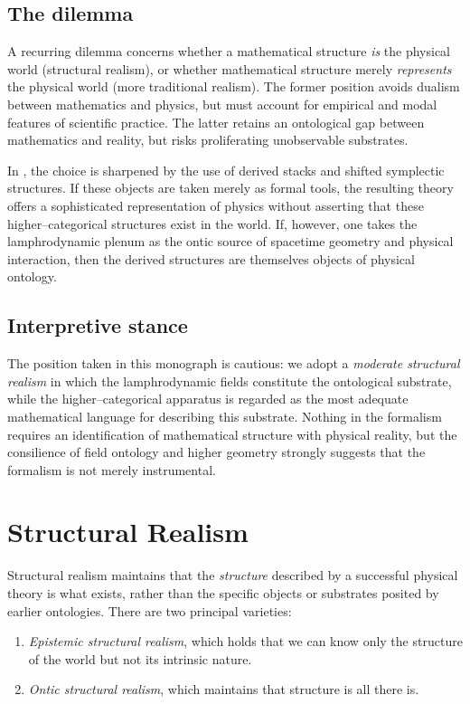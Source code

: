 \subsection{The dilemma}
A recurring dilemma concerns whether a mathematical structure \emph{is}
the physical world (structural realism), or whether mathematical
structure merely \emph{represents} the physical world (more traditional
realism).  The former position avoids dualism between mathematics and
physics, but must account for empirical and modal features of
scientific practice.  The latter retains an ontological gap between
mathematics and reality, but risks proliferating unobservable
substrates.

In \rsvpabbr{}, the choice is sharpened by the use of derived stacks and
shifted symplectic structures.  If these objects are taken merely as
formal tools, the resulting theory offers a sophisticated representation
of physics without asserting that these higher--categorical structures
exist in the world.  If, however, one takes the lamphrodynamic plenum as
the ontic source of spacetime geometry and physical interaction, then
the derived structures are themselves objects of physical ontology.

\subsection{Interpretive stance}
The position taken in this monograph is cautious: we adopt a
\emph{moderate structural realism} in which the lamphrodynamic fields
constitute the ontological substrate, while the higher--categorical
apparatus is regarded as the most adequate mathematical language for
describing this substrate.  Nothing in the formalism requires an
identification of mathematical structure with physical reality, but the
consilience of field ontology and higher geometry strongly suggests that
the formalism is not merely instrumental.

\section{Structural Realism}

Structural realism maintains that the \emph{structure} described by a
successful physical theory is what exists, rather than the specific
objects or substrates posited by earlier ontologies.  There are two
principal varieties:

\begin{enumerate}
\item \emph{Epistemic structural realism}, which holds that we can know
only the structure of the world but not its intrinsic nature.

\item \emph{Ontic structural realism}, which maintains that structure is
all there is.
\end{enumerate}

